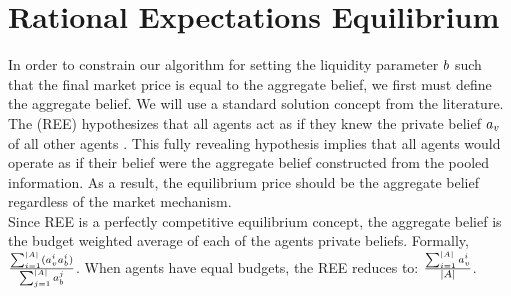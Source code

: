 \section{Rational Expectations Equilibrium}
In order to constrain our algorithm for setting the liquidity parameter $b$ such that the final market price is equal to the aggregate belief, we first must define the aggregate belief. We will use a standard solution concept from the literature.\\

The  (REE) hypothesizes that all agents act as if they knew the private belief $a_v$ of all other agents \cite{10.2307/1911360}. This fully revealing hypothesis implies that all agents would operate as if their belief were the aggregate belief constructed from the pooled information. As a result, the equilibrium price should be the aggregate belief regardless of the market mechanism.\\

Since REE is a perfectly competitive equilibrium concept, the aggregate belief is the budget weighted average of each of the agents private beliefs. Formally, $\frac{\sum_{i=1}^{|A|} (a^{i}_{v} a^{i}_{b})}{\sum_{j=1}^{|A|} a^{j}_{b}}$. When agents have equal budgets, the REE reduces to: $\frac{\sum_{i=1}^{|A|} a^{i}_{v}}{|A|}$.\\
